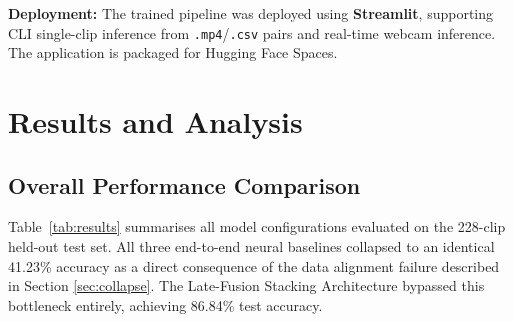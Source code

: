 \documentclass[12pt, a4paper]{article}
\begin{document}
\textbf{Deployment:} The trained pipeline was deployed using \textbf{Streamlit}, supporting CLI single-clip inference from \texttt{.mp4}/\texttt{.csv} pairs and real-time webcam inference. The application is packaged for Hugging Face Spaces.

\usepackage{placeins} %

\section{Results and Analysis}

\subsection{Overall Performance Comparison}

Table~\ref{tab:results} summarises all model configurations evaluated on the 228-clip held-out test set. All three end-to-end neural baselines collapsed to an identical 41.23\% accuracy as a direct consequence of the data alignment failure described in Section \ref{sec:collapse}. The Late-Fusion Stacking Architecture bypassed this bottleneck entirely, achieving 86.84\% test accuracy.

\begin{table}[h]
\centering
\caption{Model Performance Comparison --- Binary Valence Classification (228-clip test set)}
\label{tab:results}
\end{table}
\end{document}
